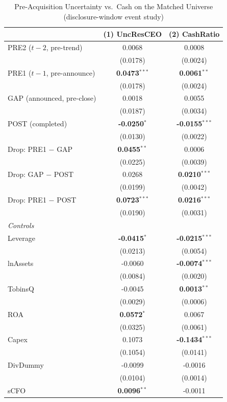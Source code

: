 \begin{table}[htbp]
\centering
\caption{Pre-Acquisition Uncertainty vs.\ Cash on the Matched Universe (disclosure-window event study)}
\label{tab:empire_drop_matched}
\scriptsize
\begin{tabular}{lcc}
\toprule
 & (1) UncResCEO & (2) CashRatio \\
\midrule
PRE2 ($t{-}2$, pre-trend) & 0.0068 & 0.0008 \\
 & (0.0178) & (0.0024) \\
PRE1 ($t{-}1$, pre-announce) & \textbf{0.0473}$^{***}$ & \textbf{0.0061}$^{**}$ \\
 & (0.0178) & (0.0024) \\
GAP (announced, pre-close) & 0.0018 & 0.0055 \\
 & (0.0187) & (0.0034) \\
POST (completed) & \textbf{-0.0250}$^{*}$ & \textbf{-0.0155}$^{***}$ \\
 & (0.0130) & (0.0022) \\
\midrule
Drop: PRE1 $-$ GAP & \textbf{0.0455}$^{**}$ & 0.0006 \\
 & (0.0225) & (0.0039) \\
Drop: GAP $-$ POST & 0.0268 & \textbf{0.0210}$^{***}$ \\
 & (0.0199) & (0.0042) \\
Drop: PRE1 $-$ POST & \textbf{0.0723}$^{***}$ & \textbf{0.0216}$^{***}$ \\
 & (0.0190) & (0.0031) \\
\midrule
\multicolumn{3}{l}{\textit{Controls}} \\
Leverage & \textbf{-0.0415}$^{*}$ & \textbf{-0.0215}$^{***}$ \\
 & (0.0213) & (0.0054) \\
lnAssets & -0.0060 & \textbf{-0.0074}$^{***}$ \\
 & (0.0084) & (0.0020) \\
TobinsQ & -0.0045 & \textbf{0.0013}$^{**}$ \\
 & (0.0029) & (0.0006) \\
ROA & \textbf{0.0572}$^{*}$ & 0.0067 \\
 & (0.0325) & (0.0061) \\
Capex & 0.1073 & \textbf{-0.1434}$^{***}$ \\
 & (0.1054) & (0.0141) \\
DivDummy & -0.0099 & -0.0016 \\
 & (0.0104) & (0.0014) \\
sCFO & \textbf{0.0096}$^{**}$ & -0.0011 \\

\end{tabular}
\end{table}
